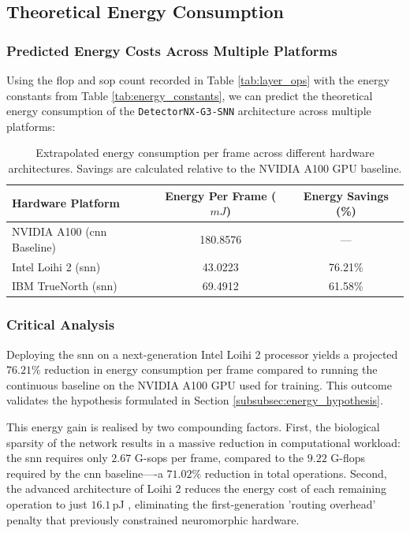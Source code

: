 \subsection{Theoretical Energy Consumption}

\subsubsection*{Predicted Energy Costs Across Multiple Platforms}

Using the \gls{flop} and \gls{sop} count recorded in Table \ref{tab:layer_ops} with the energy constants from Table \ref{tab:energy_constants}, we can predict the theoretical energy consumption of the \texttt{DetectorNX-G3-SNN} architecture across multiple platforms:

\begin{table}[htbp]
\centering
\begin{tabular}{|l|c|c|}
\hline
\textbf{Hardware Platform} & \textbf{Energy Per Frame ($mJ$)} & \textbf{Energy Savings (\%)} \\
\hline
NVIDIA A100 (\gls{cnn} Baseline) & 180.8576 & --- \\
Intel Loihi 2 (\gls{snn}) & 43.0223 & 76.21\% \\
IBM TrueNorth (\gls{snn}) & 69.4912 & 61.58\% \\
\hline
\end{tabular}
\caption[Neuromorphic Hardware Energy Extrapolation]{Extrapolated energy consumption per frame across different hardware architectures. Savings are calculated relative to the NVIDIA A100 GPU baseline.}
\label{tab:hardware_extrapolation}
\end{table}

\subsubsection*{Critical Analysis}

Deploying the \gls{snn} on a next-generation Intel Loihi 2 processor yields a projected $76.21\%$ reduction in energy consumption per frame compared to running the continuous baseline on the NVIDIA A100 GPU used for training. This outcome validates the hypothesis formulated in Section \ref{subsubsec:energy_hypothesis}.

This energy gain is realised by two compounding factors. 
First, the biological sparsity of the network results in a massive reduction in computational workload: the \gls{snn} requires only $2.67$ G-\glspl{sop} per frame, compared to the $9.22$ G-\glspl{flop} required by the \gls{cnn} baseline----a $71.02\%$ reduction in total operations. 
Second, the advanced architecture of Loihi 2 reduces the energy cost of each remaining operation to just $16.1$\,pJ \cite{gralewicz2024spikes}, eliminating the first-generation 'routing overhead' penalty that previously constrained neuromorphic hardware.


